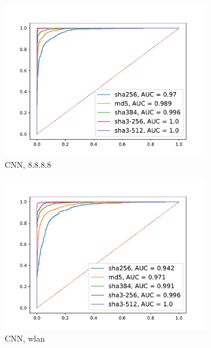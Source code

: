 \documentclass[12pt,a4paper,automark, toc=bib]{scrreprt}
\theoremstyle{definition}
\begin{document}
\begin{figure}
\begin{subfigure}{0.32\linewidth}
					\includegraphics[width=\linewidth]{figures/8.8.8.8_50_keras.pdf}
					\caption{CNN, 8.8.8.8}
				\end{subfigure}
				\begin{subfigure}{0.32\linewidth}
					\centering
					\includegraphics[width=\linewidth]{figures/wlan_50_keras.pdf}
					\caption{CNN, wlan}
				\end{subfigure}
				\begin{subfigure}{0.32\linewidth}
					\centering

\end{subfigure}
\end{figure}
\end{document}
